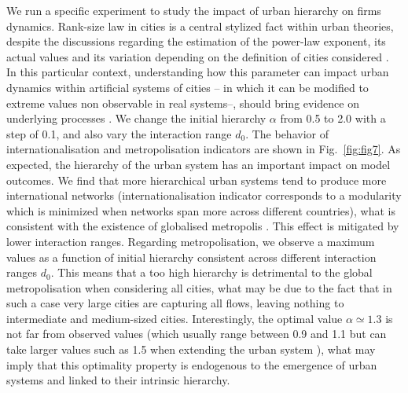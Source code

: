 \documentclass[10pt,letterpaper]{article}
\begin{document}
We run a specific experiment to study the impact of urban hierarchy on firms dynamics. Rank-size law in cities is a central stylized fact within urban theories, despite the discussions regarding the estimation of the power-law exponent, its actual values and its variation depending on the definition of cities considered \cite{cottineau2017metazipf,corral2020truncated}. In this particular context, understanding how this parameter can impact urban dynamics within artificial systems of cities -- in which it can be modified to extreme values non observable in real systems--, should bring evidence on underlying processes \cite{raimbault2019space}. We change the initial hierarchy $\alpha$ from 0.5 to 2.0 with a step of 0.1, and also vary the interaction range $d_0$. The behavior of internationalisation and metropolisation indicators are shown in Fig.~\ref{fig:fig7}. As expected, the hierarchy of the urban system has an important impact on model outcomes. We find that more hierarchical urban systems tend to produce more international networks (internationalisation indicator corresponds to a modularity which is minimized when networks span more across different countries), what is consistent with the existence of globalised metropolis \cite{sassen1991global}. This effect is mitigated by lower interaction ranges. Regarding metropolisation, we observe a maximum values as a function of initial hierarchy consistent across different interaction ranges $d_0$. This means that a too high hierarchy is detrimental to the global metropolisation when considering all cities, what may be due to the fact that in such a case very large cities are capturing all flows, leaving nothing to intermediate and medium-sized cities. Interestingly, the optimal value $\alpha \simeq 1.3$ is not far from observed values (which usually range between 0.9 and 1.1 but can take larger values such as 1.5 when extending the urban system \cite{Raimbault_2020}), what may imply that this optimality property is endogenous to the emergence of urban systems and linked to their intrinsic hierarchy.
\end{document}
